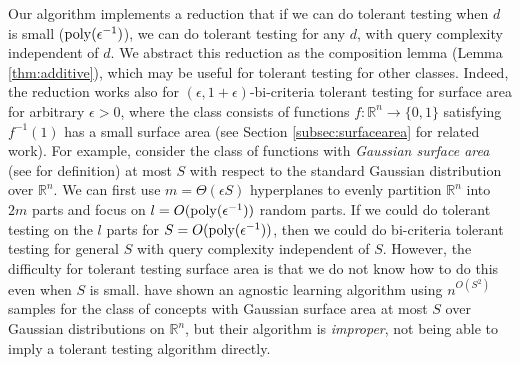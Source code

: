 Our algorithm implements a reduction that if we can do tolerant testing when $d$ is small (${\mathrm{poly}}(\epsilon^{-1})$), we can do tolerant testing for any $d$, with query complexity independent of $d$. We abstract this reduction as the composition lemma (Lemma \ref{thm:additive}), which may be useful for tolerant testing for other classes. Indeed, the reduction works also for $(\epsilon,1+\epsilon)$-bi-criteria tolerant testing for surface area for arbitrary $\epsilon>0$, where the class consists of functions $f:\mathbb{R}^n\rightarrow\{0,1\}$ satisfying $f^{-1}(1)$ has a small surface area (see Section \ref{subsec:surfacearea} for related work). For example, consider the class of functions with \emph{Gaussian surface area} (see \citep{KOS08} for definition) at most $S$ with respect to the standard Gaussian distribution over $\mathbb{R}^n$. We can first use $m=\Theta(\epsilon S)$ hyperplanes to evenly partition $\mathbb{R}^n$ into $2m$ parts and focus on $l=O({\mathrm{poly}}(\epsilon^{-1}))$ random parts. If we could do tolerant testing on the $l$ parts for $S=O({\mathrm{poly}}(\epsilon^{-1}))$, then we could do bi-criteria tolerant testing for general $S$ with query complexity independent of $S$. However, the difficulty for tolerant testing surface area is that we do not know how to do this even when $S$ is small. \citet{KOS08} have shown an agnostic learning algorithm using $n^{O(S^2)}$ samples for the class of concepts with Gaussian surface area at most $S$ over Gaussian distributions on $\mathbb{R}^n$, but their algorithm is \emph{improper}, not being able to imply a tolerant testing algorithm directly.


